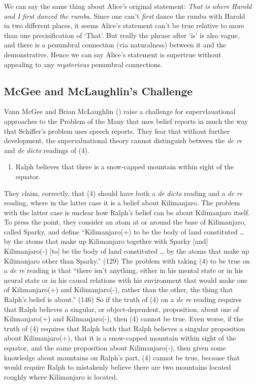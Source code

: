 \documentclass[
  11pt,
  letterpaper,
  DIV=11,
  numbers=noendperiod,
  oneside]{scrartcl}
\providecommand{\tightlist}{%
  \setlength{\itemsep}{0pt}\setlength{\parskip}{0pt}}\usepackage{longtable,booktabs,array}
\begin{document}
We can say the same thing about Alice's original statement: \emph{That
is where Harold and I first danced the rumba.} Since one can't
\emph{first} dance the rumba with Harold in two different places, it
seems Alice's statement can't be true relative to more than one
precisification of `That'. But really the phrase after `is' is also
vague, and there is a penumbral connection (via naturalness) between it
and the demonstrative. Hence we can say Alice's statement is supertrue
without appealing to any \emph{mysterious} penumbral connections.

\subsection{McGee and McLaughlin's
Challenge}\label{mcgee-and-mclaughlins-challenge}

Vann McGee and Brian McLaughlin () raise a
challenge for supervlauational approaches to the Problem of the Many
that uses belief reports in much the way that Schiffer's problem uses
speech reports. They fear that without further development, the
supervaluational theory cannot distinguish between the \emph{de re} and
\emph{de dicto} readings of (4).

\begin{enumerate}
\def\labelenumi{\arabic{enumi}.}
\tightlist
\item
  Ralph believes that there is a snow-capped mountain within sight of
  the equator.
\end{enumerate}

They claim, correctly, that (4) should have both a \emph{de dicto}
reading and a \emph{de re} reading, where in the latter case it is a
belief about Kilimanjaro. The problem with the latter case is unclear
how Ralph's belief can be about Kilimanjaro itself. To press the point,
they consider an atom at or around the base of Kilimanjaro, called
Sparky, and define ``Kilimanjaro(+) to be the body of land constituted
\ldots{} by the atoms that make up Kilimanjaro together with Sparky
{[}and{]} Kilimanjaro(-) {[}to{]} be the body of land constituted
\ldots{} by the atoms that make up Kilimanjaro other than Sparky.''
(129) The problem with taking (4) to be true on a \emph{de re} reading
is that ``there isn't anything, either in his mental state or in his
neural state or in his causal relations with his environment that would
make one of Kilimanjaro(+) and Kilimanjaro(-), rather than the other,
the thing that Ralph's belief is about.'' (146) So if the truth of (4)
on a \emph{de re} reading requires that Ralph believes a singular, or
object-dependent, proposition, about one of Kilimanjaro(+) and
Kilimanjaro(-), then (4) cannot be true. Even worse, if the truth of (4)
requires that Ralph both that Ralph believes a singular proposition
about Kilimanjaro(+), that it is a snow-capped mountain within sight of
the equator, and the same proposition about Kilimanjaro(-), then given
some knowledge about mountains on Ralph's part, (4) cannot be true,
because that would require Ralph to mistakenly believe there are two
mountains located roughly where Kilimanjaro is located.
\end{document}
